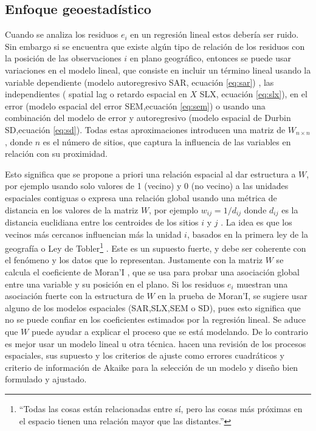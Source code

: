 \documentclass[12pt,]{book}
\let\rmarkdownfootnote\footnote%
\def\footnote{\protect\rmarkdownfootnote}
\begin{document}
\subsection{Enfoque geoestadístico}\label{enfoque-geoestadistico}

Cuando se analiza los residuos \(e_i\) en un regresión lineal estos
debería ser ruido. Sin embargo si se encuentra que existe algún tipo de
relación de los residuos con la posición de las observaciones \(i\) en
plano geográfico, entonces se puede usar variaciones en el modelo
lineal, que consiste en incluir un término lineal usando la variable
dependiente (modelo autoregresivo SAR, ecuación \eqref{eq:sar}) , las
independientes ( spatial lag o retardo espacial en \(X\) SLX, ecuación
\eqref{eq:slx}), en el error (modelo espacial del error SEM,ecuación
\eqref{eq:sem}) o usando una combinación del modelo de error y
autoregresivo (modelo espacial de Durbin SD,ecuación \eqref{eq:sd}). Todas
estas aproximaciones introducen una matriz de \(W_{n\times n}\), donde
\(n\) es el número de sitios, que captura la influencia de las variables
en relación con su proximidad.

Esto significa que se propone a priori una relación espacial al dar
estructura a \(W\), por ejemplo usando solo valores de 1 (vecino) y 0
(no vecino) a las unidades espaciales contiguas o expresa una relación
global usando una métrica de distancia en los valores de la matriz
\(W\), por ejemplo \(w_{ij}= 1/d_{ij}\) donde \(d_{ij}\) es la distancia
euclidiana entre los centroides de los sitios \(i\) y \(j\) . La idea es
que los vecinos más cercanos influencian más la unidad \(i\), basados en
la primera ley de la geografía o Ley de Tobler\footnote{``Todas las
  cosas están relacionadas entre sí, pero las cosas más próximas en el
  espacio tienen una relación mayor que las distantes.''}
\citep{tobler1970computer}. Este es un supuesto fuerte, y debe ser
coherente con el fenómeno y los datos que lo representan. Justamente con
la matriz \(W\) se calcula el coeficiente de Moran'I
\citep{moran1950notes}, que se usa para probar una asociación global
entre una variable y su posición en el plano. Si los residuos \(e_i\)
muestran una asociación fuerte con la estructura de \(W\) en la prueba
de Moran'I, se sugiere usar alguno de los modelos espaciales
(SAR,SLX,SEM o SD), pues esto significa que no se puede confiar en los
coeficientes estimados por la regresión lineal. Se aduce que \(W\) puede
ayudar a explicar el proceso que se está modelando. De lo contrario es
mejor usar un modelo lineal u otra técnica.
\citep{paez_spatial_2005, kissling_spatial_2008, anselin_under_2002}
hacen una revisión de los procesos espaciales, sus supuesto y los
criterios de ajuste como errores cuadráticos y criterio de información
de Akaike para la selección de un modelo y diseño bien formulado y
ajustado.
\end{document}
